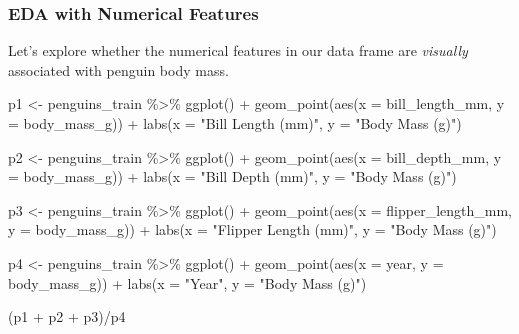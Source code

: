 \documentclass[
  letterpaper,
  DIV=11,
  numbers=noendperiod]{scrartcl}
\newenvironment{Shaded}{\begin{snugshade}}{\end{snugshade}}
\newcommand{\AttributeTok}[1]{\textcolor[rgb]{0.40,0.45,0.13}{#1}}
\newcommand{\FunctionTok}[1]{\textcolor[rgb]{0.28,0.35,0.67}{#1}}
\newcommand{\NormalTok}[1]{\textcolor[rgb]{0.00,0.23,0.31}{#1}}
\newcommand{\OtherTok}[1]{\textcolor[rgb]{0.00,0.23,0.31}{#1}}
\newcommand{\SpecialCharTok}[1]{\textcolor[rgb]{0.37,0.37,0.37}{#1}}
\newcommand{\StringTok}[1]{\textcolor[rgb]{0.13,0.47,0.30}{#1}}
\begin{document}
\subsubsection{EDA with Numerical
Features}\label{eda-with-numerical-features}

Let's explore whether the numerical features in our data frame are
\emph{visually} associated with penguin body mass.

\begin{Shaded}
\begin{Highlighting}[]
\NormalTok{p1 }\OtherTok{\textless{}{-}}\NormalTok{ penguins\_train }\SpecialCharTok{\%\textgreater{}\%}
  \FunctionTok{ggplot}\NormalTok{() }\SpecialCharTok{+}
  \FunctionTok{geom\_point}\NormalTok{(}\FunctionTok{aes}\NormalTok{(}\AttributeTok{x =}\NormalTok{ bill\_length\_mm, }\AttributeTok{y =}\NormalTok{ body\_mass\_g)) }\SpecialCharTok{+}
  \FunctionTok{labs}\NormalTok{(}\AttributeTok{x =} \StringTok{"Bill Length (mm)"}\NormalTok{,}
       \AttributeTok{y =} \StringTok{"Body Mass (g)"}\NormalTok{)}

\NormalTok{p2 }\OtherTok{\textless{}{-}}\NormalTok{ penguins\_train }\SpecialCharTok{\%\textgreater{}\%}
  \FunctionTok{ggplot}\NormalTok{() }\SpecialCharTok{+}
  \FunctionTok{geom\_point}\NormalTok{(}\FunctionTok{aes}\NormalTok{(}\AttributeTok{x =}\NormalTok{ bill\_depth\_mm, }\AttributeTok{y =}\NormalTok{ body\_mass\_g)) }\SpecialCharTok{+}
  \FunctionTok{labs}\NormalTok{(}\AttributeTok{x =} \StringTok{"Bill Depth (mm)"}\NormalTok{,}
       \AttributeTok{y =} \StringTok{"Body Mass (g)"}\NormalTok{)}

\NormalTok{p3 }\OtherTok{\textless{}{-}}\NormalTok{ penguins\_train }\SpecialCharTok{\%\textgreater{}\%}
  \FunctionTok{ggplot}\NormalTok{() }\SpecialCharTok{+}
  \FunctionTok{geom\_point}\NormalTok{(}\FunctionTok{aes}\NormalTok{(}\AttributeTok{x =}\NormalTok{ flipper\_length\_mm, }\AttributeTok{y =}\NormalTok{ body\_mass\_g)) }\SpecialCharTok{+}
  \FunctionTok{labs}\NormalTok{(}\AttributeTok{x =} \StringTok{"Flipper Length (mm)"}\NormalTok{,}
       \AttributeTok{y =} \StringTok{"Body Mass (g)"}\NormalTok{)}

\NormalTok{p4 }\OtherTok{\textless{}{-}}\NormalTok{ penguins\_train }\SpecialCharTok{\%\textgreater{}\%}
  \FunctionTok{ggplot}\NormalTok{() }\SpecialCharTok{+}
  \FunctionTok{geom\_point}\NormalTok{(}\FunctionTok{aes}\NormalTok{(}\AttributeTok{x =}\NormalTok{ year, }\AttributeTok{y =}\NormalTok{ body\_mass\_g)) }\SpecialCharTok{+}
  \FunctionTok{labs}\NormalTok{(}\AttributeTok{x =} \StringTok{"Year"}\NormalTok{,}
       \AttributeTok{y =} \StringTok{"Body Mass (g)"}\NormalTok{)}

\NormalTok{(p1 }\SpecialCharTok{+}\NormalTok{ p2 }\SpecialCharTok{+}\NormalTok{ p3)}\SpecialCharTok{/}\NormalTok{p4}
\end{Highlighting}
\end{Shaded}
\end{document}
